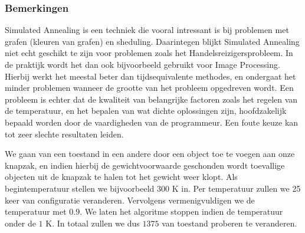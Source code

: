\subsubsection{Bemerkingen}
Simulated Annealing is een techniek die vooral intressant is bij problemen met grafen (kleuren van grafen) en sheduling. Daarintegen blijkt Simulated Annealing niet echt geschikt te zijn voor problemen zoals het Handelsreizigersprobleem. In de praktijk wordt het dan ook bijvoorbeeld gebruikt voor Image Processing. Hierbij werkt het meestal beter dan tijdsequivalente methodes, en ondergaat het minder problemen wanneer de grootte van het probleem opgedreven wordt. Een probleem is echter dat de kwaliteit van belangrijke factoren zoals het regelen van de temperatuur, en het bepalen van wat dichte oplossingen zijn, hoofdzakelijk bepaald worden door de vaardigheden van de programmeur. Een foute keuze kan tot zeer slechte resultaten leiden.
\begin{leftbar}
We gaan van een toestand in een andere door een object toe te voegen aan onze knapzak, en indien hierbij de gewichtvoorwaarde geschonden wordt toevallige objecten uit de knapzak te halen tot het gewicht weer klopt. Als begintemperatuur stellen we bijvoorbeeld $300\mbox{ K}$ in. Per temperatuur zullen we 25 keer van configuratie veranderen. Vervolgens vermenigvuldigen we de temperatuur met $0.9$. We laten het algoritme stoppen indien de temperatuur onder de $1\mbox{ K}$. In totaal zullen we dus $1375$ van toestand proberen te veranderen.
\end{leftbar}

